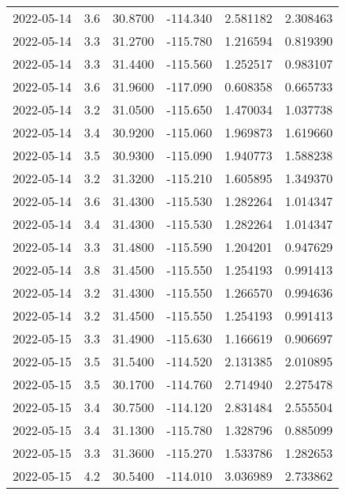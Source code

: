 \begin{tabular}{lrrrrr}
2022-05-14 &       3.6 &  30.8700 &  -114.340 &         2.581182 &         2.308463 \\
2022-05-14 &       3.3 &  31.2700 &  -115.780 &         1.216594 &         0.819390 \\
2022-05-14 &       3.3 &  31.4400 &  -115.560 &         1.252517 &         0.983107 \\
2022-05-14 &       3.6 &  31.9600 &  -117.090 &         0.608358 &         0.665733 \\
2022-05-14 &       3.2 &  31.0500 &  -115.650 &         1.470034 &         1.037738 \\
2022-05-14 &       3.4 &  30.9200 &  -115.060 &         1.969873 &         1.619660 \\
2022-05-14 &       3.5 &  30.9300 &  -115.090 &         1.940773 &         1.588238 \\
2022-05-14 &       3.2 &  31.3200 &  -115.210 &         1.605895 &         1.349370 \\
2022-05-14 &       3.6 &  31.4300 &  -115.530 &         1.282264 &         1.014347 \\
2022-05-14 &       3.4 &  31.4300 &  -115.530 &         1.282264 &         1.014347 \\
2022-05-14 &       3.3 &  31.4800 &  -115.590 &         1.204201 &         0.947629 \\
2022-05-14 &       3.8 &  31.4500 &  -115.550 &         1.254193 &         0.991413 \\
2022-05-14 &       3.2 &  31.4300 &  -115.550 &         1.266570 &         0.994636 \\
2022-05-14 &       3.2 &  31.4500 &  -115.550 &         1.254193 &         0.991413 \\
2022-05-15 &       3.3 &  31.4900 &  -115.630 &         1.166619 &         0.906697 \\
2022-05-15 &       3.5 &  31.5400 &  -114.520 &         2.131385 &         2.010895 \\
2022-05-15 &       3.5 &  30.1700 &  -114.760 &         2.714940 &         2.275478 \\
2022-05-15 &       3.4 &  30.7500 &  -114.120 &         2.831484 &         2.555504 \\
2022-05-15 &       3.4 &  31.1300 &  -115.780 &         1.328796 &         0.885099 \\
2022-05-15 &       3.3 &  31.3600 &  -115.270 &         1.533786 &         1.282653 \\
2022-05-15 &       4.2 &  30.5400 &  -114.010 &         3.036989 &         2.733862 \\

\end{tabular}

